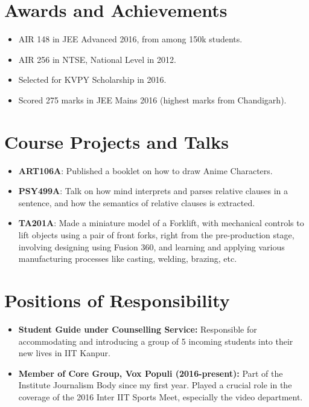 \documentclass[a4paper, 10pt]{article}
\begin{document}
\section*{Awards and Achievements}

\begin{itemize}
    \item AIR 148 in JEE Advanced 2016, from among 150k students.
    \item AIR 256 in NTSE, National Level in 2012.
    \item Selected for KVPY Scholarship in 2016.
    \item Scored 275 marks in JEE Mains 2016 (highest marks from Chandigarh).
\end{itemize}

\section*{Course Projects and Talks}

\begin{itemize}
    \item \textbf{ART106A}: Published a booklet on how to draw Anime Characters.
    \item \textbf{PSY499A}: Talk on how mind interprets and parses relative clauses in a sentence, and how the semantics of relative clauses is extracted.
    \item \textbf{TA201A}: Made a miniature model of a Forklift, with mechanical controls to lift objects using a pair of front forks, right from the pre-production stage, involving designing using Fusion 360, and learning and applying various manufacturing processes like casting, welding, brazing, etc.
\end{itemize}

\section*{Positions of Responsibility}
\begin{itemize}
    \item \textbf{Student Guide under Counselling Service:} Responsible for accommodating and introducing a group of 5 incoming students into their new lives in IIT Kanpur.
    \item \textbf{Member of Core Group, Vox Populi (2016-present):} Part of the Institute Journalism Body since my first year. Played a crucial role in the coverage of the 2016 Inter IIT Sports Meet, especially the video department.
\end{itemize}
\end{document}
